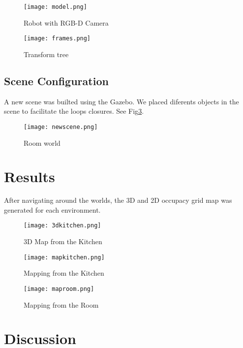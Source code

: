 \documentclass[10pt,journal,compsoc]{IEEEtran}
\begin{document}
\begin{figure}[thpb]
      \centering
      \texttt{[image: model.png]}
      \caption{Robot with RGB-D Camera}
      \label{fig:rgbd}
\end{figure}

\begin{figure}[thpb]
      \centering
      \texttt{[image: frames.png]}
      \caption{Transform tree}
      \label{fig:tree}
\end{figure}


\subsection{Scene Configuration}

A new scene was builted using the Gazebo. We placed diferents objects in the scene to facilitate the loops closures. See
Fig\ref{fig:room}.

\begin{figure}[thpb]
      \centering
      \texttt{[image: newscene.png]}
      \caption{Room world}
      \label{fig:room}
\end{figure}

\section{Results}

After navigating around the worlds, the 3D and 2D occupacy grid map was generated for each environment. 

\begin{figure}[thpb]
      \centering
      \texttt{[image: 3dkitchen.png]}
      \caption{3D Map from the Kitchen}
\end{figure}

\begin{figure}[thpb]
      \centering
      \texttt{[image: mapkitchen.png]}
      \caption{Mapping from the Kitchen}
\end{figure}

\begin{figure}[thpb]
      \centering
      \texttt{[image: maproom.png]}

      \caption{Mapping from the Room}
\end{figure}

\section{Discussion}
\end{document}

